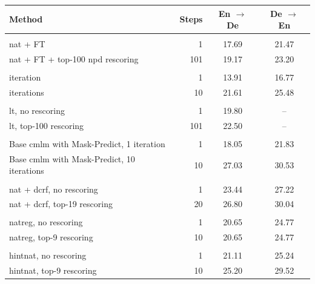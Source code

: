 
\begin{table}
  \centering

  \begin{tabular}{lrcc}
    \toprule
    Method & Steps & En $\rightarrow$ De & De $\rightarrow$ En \\
    \midrule
    \citet{gu2017nonautoregressive} & & & \\
    \quad \acs{nat} + FT & 1 & 17.69 & 21.47 \\
    \quad \acs{nat} + FT + top-100 \acs{npd} rescoring & 101 & 19.17 & 23.20 \\

    \citet{lee-etal-2018-deterministic} & & \\
    \quad 1 iteration & 1 & 13.91 & 16.77 \\
    \quad 10 iterations & 10 & 21.61 & 25.48 \\

    \citet{kaiser2018fast} & & \\
    \quad \acs{lt}, no rescoring & 1 & 19.80 & -- \\
    \quad \acs{lt}, top-100 rescoring & 101 & 22.50 & -- \\

    \citet{ghazvininejad-etal-2019-mask} & & \\
    \quad Base \acs{cmlm} with Mask-Predict, 1 iteration & 1 & 18.05 & 21.83 \\
    \quad Base \acs{cmlm} with Mask-Predict, 10 iterations & 10 & 27.03 & 30.53 \\

    \citet{sun2019fast} & & & \\
    \quad \acs{nat} + \acs{dcrf}, no rescoring & 1 & 23.44 & 27.22 \\
    \quad \acs{nat} + \acs{dcrf}, top-19 rescoring & 20 & 26.80 & 30.04 \\

    \citet{wang-etal-2019-nonautoregressive} & & & \\
    \quad \acs{natreg}, no rescoring & 1 &  20.65 & 24.77 \\
    \quad \acs{natreg}, top-9 rescoring & 10 & 20.65 & 24.77 \\

    \citet{li-etal-2019-hint} & & & \\
    \quad \acs{hintnat}, no rescoring & 1 & 21.11  & 25.24 \\
    \quad \acs{hintnat}, top-9 rescoring & 10 & 25.20  & 29.52 \\


\end{tabular}
\end{table}
